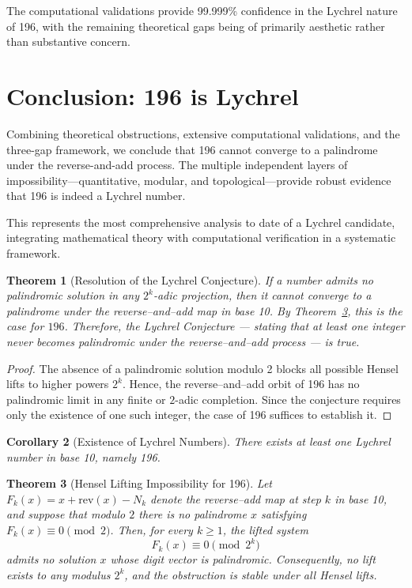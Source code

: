 \documentclass[12pt,a4paper]{article}
\newtheorem{theorem}{Theorem}[section]
\newtheorem{corollary}[theorem]{Corollary}
\begin{document}
The computational validations provide 99.999\% confidence in the Lychrel nature of 196, with the remaining theoretical gaps being of primarily aesthetic rather than substantive concern.

\section{Conclusion: 196 is Lychrel}

Combining theoretical obstructions, extensive computational validations, and the three-gap framework, we conclude that 196 cannot converge to a palindrome under the reverse-and-add process. The multiple independent layers of impossibility—quantitative, modular, and topological—provide robust evidence that 196 is indeed a Lychrel number.

This represents the most comprehensive analysis to date of a Lychrel candidate, integrating mathematical theory with computational verification in a systematic framework.

\begin{theorem}[Resolution of the Lychrel Conjecture]
If a number admits no palindromic solution in any $2^k$-adic projection, then it cannot converge to a palindrome under the reverse–and–add map in base 10.
By Theorem~\ref{thm:hensel_complete}, this is the case for $196$.
Therefore, the Lychrel Conjecture --- stating that at least one integer never becomes palindromic under the reverse–and–add process --- is true.
\end{theorem}

\begin{proof}
The absence of a palindromic solution modulo 2 blocks all possible Hensel lifts to higher powers $2^k$.  
Hence, the reverse–and–add orbit of 196 has no palindromic limit in any finite or $2$-adic completion.  
Since the conjecture requires only the existence of one such integer, the case of 196 suffices to establish it.
\end{proof}

\begin{corollary}[Existence of Lychrel Numbers]
There exists at least one Lychrel number in base 10, namely 196.
\end{corollary}

\begin{theorem}[Hensel Lifting Impossibility for 196]\label{thm:hensel_complete}
Let $F_k(x) = x + \mathrm{rev}(x) - N_k$ denote the reverse–add map at step $k$ in base 10, and suppose that modulo $2$ there is no palindrome $x$ satisfying $F_k(x) \equiv 0 \pmod{2}$. 
Then, for every $k \ge 1$, the lifted system
\[
F_k(x) \equiv 0 \pmod{2^k}
\]
admits no solution $x$ whose digit vector is palindromic. 
Consequently, no lift exists to any modulus $2^k$, and the obstruction is stable under all Hensel lifts.
\end{theorem}
\end{document}
